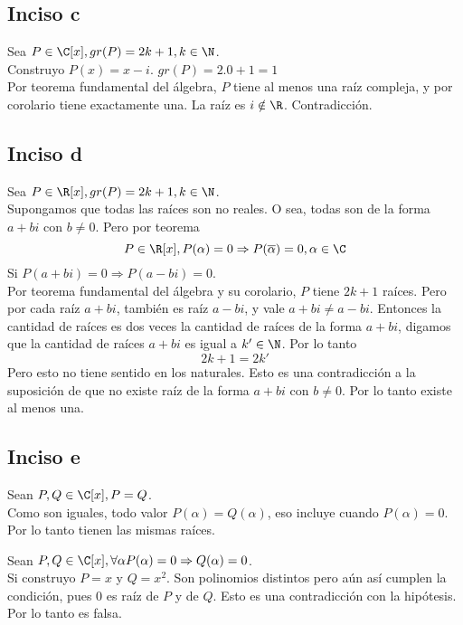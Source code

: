 \documentclass[10pt]{article}
\begin{document}
\subsection{Inciso c}
\begin{prf}{}
	Sea $P \in \C[x], gr(P) = 2k+1, k \in \N$.\\
	Construyo $P(x) = x - i$. $gr(P) = 2.0+1 = 1$\\
	Por teorema fundamental del álgebra, $P$ tiene al menos una raíz compleja, y por corolario tiene exactamente una. La raíz es $i \notin \R$. Contradicción.
\end{prf}

\subsection{Inciso d}
\begin{prf}{}
	Sea $P \in \R[x], gr(P) = 2k+1, k \in \N$.\\
	Supongamos que todas las raíces son no reales. O sea, todas son de la forma $a + bi$ con $b \neq 0$. Pero por teorema
	$$P \in \R[x], P(\alpha) = 0 \Rightarrow P(\overline{\alpha}) = 0, \alpha \in \C$$
	Si $P(a+bi) = 0 \Rightarrow P(a-bi) = 0$.\\
	Por teorema fundamental del álgebra y su corolario, $P$ tiene $2k+1$ raíces. Pero por cada raíz $a+bi$, también es raíz $a-bi$, y vale $a+bi \neq a-bi$. Entonces la cantidad de raíces es dos veces la cantidad de raíces de la forma $a+bi$, digamos que la cantidad de raíces $a+bi$ es igual a $k' \in \N$. Por lo tanto
	$$2k+1 = 2k'$$
	Pero esto no tiene sentido en los naturales. Esto es una contradicción a la suposición de que no existe raíz de la forma $a+bi$ con $b \neq 0$. Por lo tanto existe al menos una.
\end{prf}

\subsection{Inciso e}
\begin{prf}[$P = Q \Leftrightarrow \forall \alpha P(\alpha) = 0 \Rightarrow Q(\alpha) = 0$]{}
	Sean $P,Q \in \C[x], P = Q$.\\
	Como son iguales, todo valor $P(\alpha) = Q(\alpha)$, eso incluye cuando $P(\alpha) = 0$. Por lo tanto tienen las mismas raíces.

	Sean $P,Q \in \C[x], \forall \alpha P(\alpha) = 0 \Rightarrow Q(\alpha) = 0$.\\
	Si construyo $P = x$ y $Q = x^2$. Son polinomios distintos pero aún así cumplen la condición, pues $0$ es raíz de $P$ y de $Q$. Esto es una contradicción con la hipótesis. Por lo tanto es falsa.
\end{prf}
\end{document}
